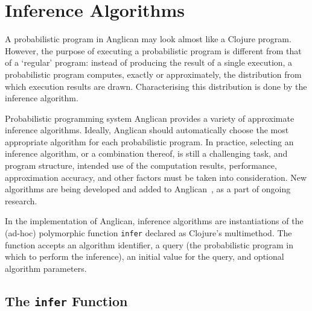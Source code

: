 \documentclass[sigconf]{acmart}
\begin{document}
\section{Inference Algorithms}
\label{sec:inference}

A probabilistic program in Anglican may look almost like a
Clojure program. However, the purpose of executing a
probabilistic program is different from that of a `regular'
program: instead of producing the result of a single execution,
a probabilistic program computes, exactly or approximately, the
distribution from which execution results are drawn.  Characterising
this distribution is done by the inference algorithm.

Probabilistic programming system Anglican provides a variety of
approximate inference algorithms. Ideally, Anglican should
automatically choose the most appropriate algorithm for each
probabilistic program. In practice, selecting an inference
algorithm, or a combination thereof, is still a challenging
task, and program structure, intended use of the computation
results, performance, approximation accuracy, and other factors
must be taken into consideration. New algorithms are being
developed and added to Anglican~\cite{TMP+15,MPT+16,RNL+2016},
as a part of ongoing research.

In the implementation of Anglican, inference algorithms are
instantiations of the (ad-hoc) polymorphic function
\texttt{infer} declared as Clojure's multimethod\iftoggle{full}{
in the \texttt{anglican.{\linebreak[0]}inference}
namespace}{}. The function accepts an algorithm identifier,
a query (the probabilistic program in which to perform the
inference), an initial value for the query, and optional
algorithm parameters.

\subsection{The \texttt{infer} Function}
\label{sec:infer}
\end{document}
